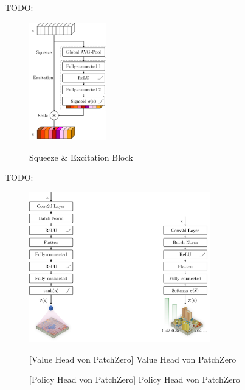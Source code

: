 TODO:

\begin{figure}
    \centering
    \includegraphics[width=0.3\textwidth]{res/pictures/squeeze-and-excitation-block.pdf}
    \caption[Squeeze \& Excitation Block]{\unskip}
    Squeeze \& Excitation Block
    \label{fig:squeeze-and-excitation-block}
\end{figure}

TODO:

\pagebreak

\begin{figure}[!ht]
    \centering
    \includegraphics[width=0.7\textwidth]{res/pictures/value-and-policy-head.pdf}
    \\
    \begin{minipage}{.49\textwidth}
        \centering
        [Value Head von PatchZero]{\unskip}
        Value Head von PatchZero
        \label{fig:value-head}
    \end{minipage}
    \hfill
    \begin{minipage}{.49\textwidth}
        \centering
        [Policy Head von PatchZero]{\unskip}
        Policy Head von PatchZero
        \label{fig:policy-head}
    \end{minipage}
\end{figure}

